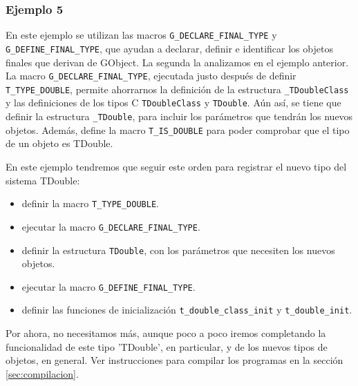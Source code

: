 \subsubsection{Ejemplo 5}
En este ejemplo se utilizan las macros \texttt{G\_DECLARE\_FINAL\_TYPE} y
\texttt{G\_DEFINE\_FINAL\_TYPE}, que ayudan a declarar, definir e identificar los objetos finales que
derivan de \textsf{GObject}. La segunda la analizamos en el ejemplo anterior.
La macro \texttt{G\_DECLARE\_FINAL\_TYPE}, ejecutada justo después de definir \texttt{T\_TYPE\_DOUBLE},
permite ahorrarnos la definición de la estructura \texttt{\_TDoubleClass} y las definiciones de los
tipos C \texttt{TDoubleClass} y \texttt{TDouble}. Aún así, se tiene que definir la estructura \texttt{\_TDouble},
para incluir los parámetros que tendrán los nuevos objetos. Además, define la macro \texttt{T\_IS\_DOUBLE}
para poder comprobar que el tipo de un objeto es \textsf{TDouble}.

En este ejemplo tendremos  que seguir este orden para registrar el nuevo tipo del sistema \textsf{TDouble}:
\begin{itemize}
  \tightlist
\item definir la macro \texttt{T\_TYPE\_DOUBLE}.
\item ejecutar la macro \texttt{G\_DECLARE\_FINAL\_TYPE}.
\item definir la estructura \texttt{TDouble}, con los parámetros que necesiten los nuevos objetos.
\item ejecutar la macro \texttt{G\_DEFINE\_FINAL\_TYPE}.
\item definir las funciones de inicialización \texttt{t\_double\_class\_init} y \texttt{t\_double\_init}.
\end{itemize}
Por ahora, no necesitamos más, aunque poco a poco iremos completando la funcionalidad
de este tipo 'TDouble', en particular, y de los nuevos tipos de objetos, en general.
Ver instrucciones para compilar los programas en la sección \ref{sec:compilacion}.

